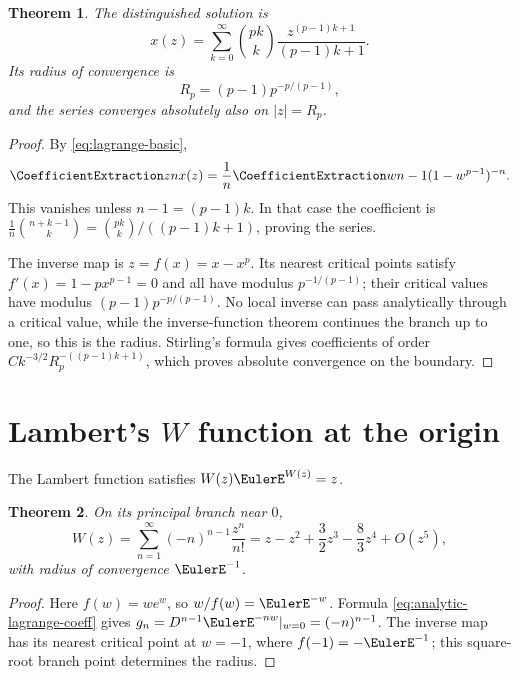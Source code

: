 \documentclass[11pt,a4paper,oneside,openany]{book}
\newtheorem{theorem}{Theorem}[chapter]
\theoremstyle{definition}
\theoremstyle{remark}
\begin{document}
\begin{theorem}\label{thm:fuss-series}
The distinguished solution is
\begin{equation}\label{eq:fuss-series}
 x(z)=\sum_{k=0}^{\infty}\binom{pk}{k}
       \frac{z^{(p-1)k+1}}{(p-1)k+1}.
\end{equation}
Its radius of convergence is
\begin{equation}\label{eq:fuss-radius}
 R_p=(p-1)p^{-p/(p-1)},
\end{equation}
and the series converges absolutely also on $|z|=R_p$.
\end{theorem}
\begin{proof}
By \eqref{eq:lagrange-basic},
\[
 \CoefficientExtraction znx(z)=\frac1n\CoefficientExtraction w{n-1}(1-w^{p-1})^{-n}.
\]
This vanishes unless $n-1=(p-1)k$.  In that case the coefficient is
$\frac1n\binom{n+k-1}{k}=\binom{pk}{k}/((p-1)k+1)$, proving the series.

The inverse map is $z=f(x)=x-x^p$.  Its nearest critical points satisfy
$f'(x)=1-px^{p-1}=0$ and all have modulus $p^{-1/(p-1)}$; their critical values
have modulus $(p-1)p^{-p/(p-1)}$.  No local inverse can pass analytically through
a critical value, while the inverse-function theorem continues the branch up to
one, so this is the radius.  Stirling's formula gives coefficients of order
$Ck^{-3/2}R_p^{-((p-1)k+1)}$, which proves absolute convergence on the boundary.
\end{proof}

\section{Lambert's \texorpdfstring{$W$}{W} function at the origin}
The Lambert function satisfies $W(z)\EulerE^{W(z)}=z$.
\begin{theorem}\label{thm:lambert-W-zero}
On its principal branch near $0$,
\begin{equation}\label{eq:lambert-W-zero}
 W(z)=\sum_{n=1}^{\infty}(-n)^{n-1}\frac{z^n}{n!}
 =z-z^2+\frac32z^3-\frac83z^4+O(z^5),
\end{equation}
with radius of convergence $\EulerE^{-1}$.
\end{theorem}
\begin{proof}
Here $f(w)=we^w$, so $w/f(w)=\EulerE^{-w}$.  Formula
\eqref{eq:analytic-lagrange-coeff} gives
$g_n=D^{n-1}\EulerE^{-nw}|_{w=0}=(-n)^{n-1}$.  The inverse map has its nearest critical
point at $w=-1$, where $f(-1)=-\EulerE^{-1}$; this square-root branch point determines
the radius.
\end{proof}
\end{document}
